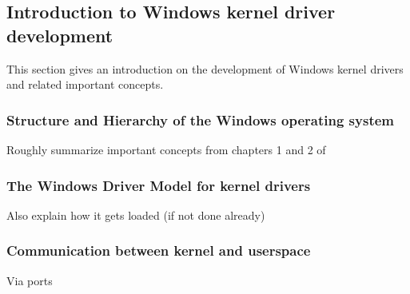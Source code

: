 \subsection{Introduction to Windows kernel driver development}
This section gives an introduction on the development of Windows kernel drivers and related important concepts.

\subsubsection{Structure and Hierarchy of the Windows operating system}
Roughly summarize important concepts from chapters 1 and 2 of \cite{Yosifovich2017}

\subsubsection{The Windows Driver Model for kernel drivers}
Also explain how it gets loaded (if not done already)

\subsubsection{Communication between kernel and userspace}
Via ports